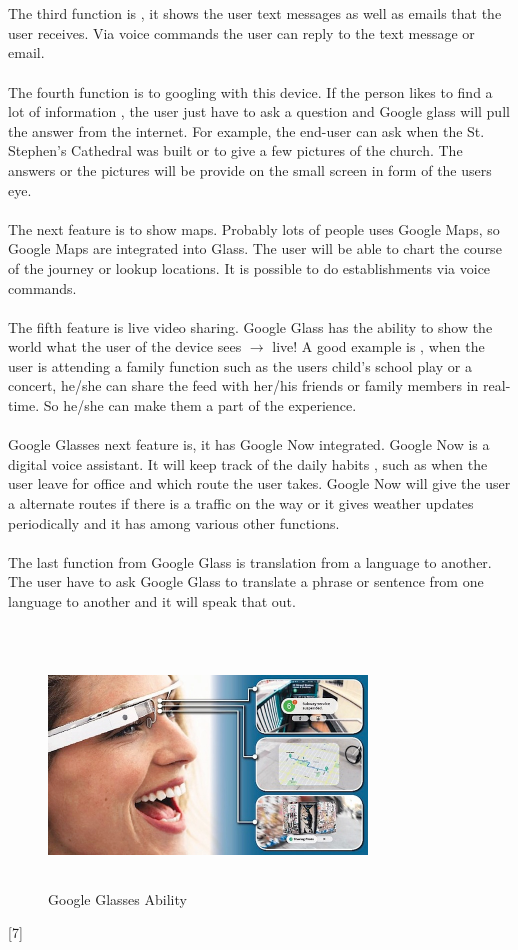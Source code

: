  \\
 \\
 The third function is , it shows the user text messages as well as emails that the user receives. Via voice commands the user can reply to the text message or email.
 \\
 \\
 The fourth function is to googling with this device. If the person likes to find a lot of information , the user just have to ask a question and Google glass will pull the answer from the internet. For example, the end-user can ask when the St. Stephen's Cathedral was built or to give a few pictures of the church. The answers or the pictures will be provide on the small screen in form of the users eye.
 \\
 \\
 The next feature is to show maps. Probably lots of people uses Google Maps, so Google Maps are integrated into Glass. The user will be able to chart the course of the journey or lookup locations. It is possible to do establishments via voice commands.
 \\
 \\
 The fifth feature is live video sharing. Google Glass has the ability to show the world what the user of the device sees  $\rightarrow$ live! A good example is , when the user is attending a family function such as the users child's school play or a concert, he/she can share the feed with her/his friends or family members in real-time. So he/she can make them a part of the experience.
 \\
 \\
 Google Glasses next feature is, it has Google Now integrated. Google Now is a digital voice assistant. It will keep track of the daily habits , such as when the user leave for office and which  route the user takes.  Google Now  will give the user a alternate routes if there is a traffic on the way or it gives weather updates periodically and it has among various other functions.
 \\
 \\
 The last function from  Google Glass is translation from a language to another. The user have to ask Google Glass to translate a phrase or sentence from one language to another and it will speak that out.
 \\
 \\
 \begin{figure}[htbp]
 \centering
 \includegraphics[width=240pt,height=180pt,keepaspectratio]{graphics/googlefunctions.png}
 \caption{Google Glasses Ability\cite{glassesPic}}
 \end{figure}
 [7]

